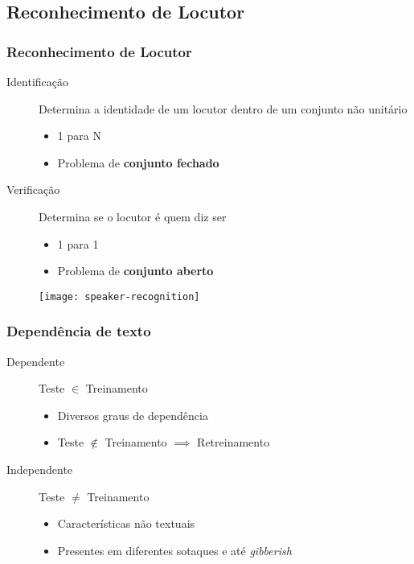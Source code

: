 \subsection{Reconhecimento de Locutor}

\begin{frame}
\frametitle{Reconhecimento de Locutor}
\begin{description}
    \item[Identificação] Determina a identidade de um locutor dentro de um conjunto não unitário
    \pause
    \begin{itemize}
        \item 1 para N
        \pause
        \item Problema de \textbf{conjunto fechado}
        \pause
    \end{itemize}
    \item[Verificação] Determina se o locutor é quem diz ser
    \pause
    \begin{itemize}
        \item 1 para 1
        \pause
        \item Problema de \textbf{conjunto aberto}
        \pause
    \end{itemize}
\end{description}

\begin{figure}
    \centering
    \texttt{[image: speaker-recognition]}
\end{figure}
\end{frame}

\begin{frame}
\frametitle{Dependência de texto}
\begin{description}
    \item[Dependente] Teste $\in$ Treinamento
    \pause
    \begin{itemize}
        \item Diversos graus de dependência
        \pause
        \item Teste $\not\in$ Treinamento $\implies$ Retreinamento
        \pause
    \end{itemize}
    \item[Independente] Teste $\neq$ Treinamento
    \pause
    \begin{itemize}
        \item Características não textuais
        \pause
        \item Presentes em diferentes sotaques e até \emph{gibberish}
    \end{itemize}
\end{description}
\end{frame}

